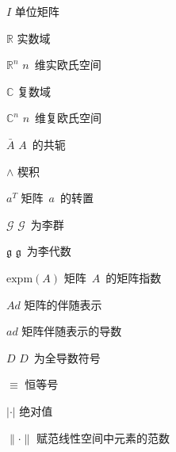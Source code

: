 \begin{denotation}
        \item[$I$]                       单位矩阵
        \item[$\mathbb{R}$]              实数域
        \item[$\mathbb{R}^n$]           $n$~维实欧氏空间
        \item[$\mathbb{C}$]              复数域
        \item[$\mathbb{C}^n$]          $n$~维复欧氏空间
        \item[$\bar{A}$]					$A$~的共轭
        \item[$\wedge$]					楔积
        \item[$a^T$]          矩阵~$a$~的转置
        \item[$\mathcal{G}$]              $\mathcal{G}$~为李群
        \item[$\mathfrak{g}$]              $\mathfrak{g}$~为李代数
        \item[$\mbox{expm}(A)$]                矩阵~$A$~的矩阵指数
        \item[$Ad$]           矩阵的伴随表示
        \item[$ad$]          矩阵伴随表示的导数
        \item[$D$]			$D$~为全导数符号
        \item[$\equiv$]                  恒等号
        \item[$| \cdot |$]               绝对值
        \item[$\| \cdot \|$]             赋范线性空间中元素的范数


\end{denotation}